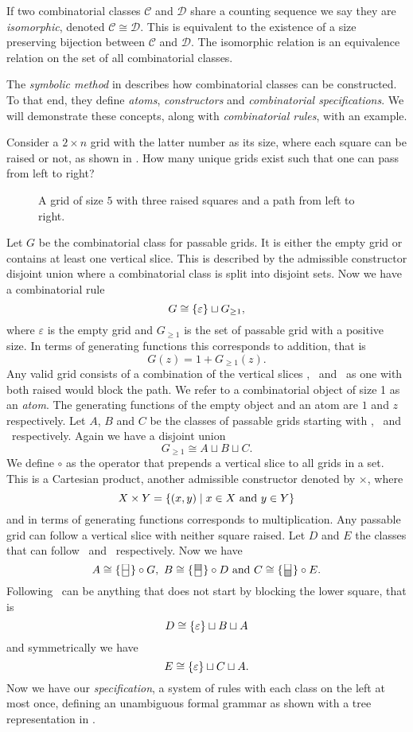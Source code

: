 If two combinatorial classes $\mathcal{C}$ and $\mathcal{D}$ share a counting sequence we say they are \emph{isomorphic}, denoted $\mathcal{C} \cong \mathcal{D}$. This is equivalent to the existence of a size preserving bijection between $\mathcal{C}$ and $\mathcal{D}$. The isomorphic relation is an equivalence relation on the set of all combinatorial classes.

The \emph{symbolic method} in  describes how combinatorial classes can be constructed. To that end, they define \emph{atoms}, \emph{constructors} and \emph{combinatorial specifications}. We will demonstrate these concepts, along with \emph{combinatorial rules}, with an example. 

Consider a $2 \times n$ grid with the latter number as its size, where each square can be raised or not, as shown in . How many unique grids exist such that one can pass from left to right?

\begin{figure}[htbp]
    \centering
    
    \caption{A grid of size $5$ with three raised squares and a path from left to right.}
    \label{fig:raised_grid}
\end{figure}

Let $G$ be the combinatorial class for passable grids. It is either the empty grid or contains at least one vertical slice. This is described by the admissible constructor disjoint union where a combinatorial class is split into disjoint sets. Now we have a combinatorial rule 
\[
    G \cong \left\{\varepsilon\right\} \sqcup G_{\geq 1},
\]
where $\varepsilon$ is the empty grid and $G_{\geq 1}$ is the set of passable grid with a positive size. In terms of generating functions this corresponds to addition, that is 
\[
    G(z) = 1 + G_{\geq1}(z).
\] 
Any valid grid consists of a combination of the vertical slices \gridN, \gridU\ and \gridD\ as one with both raised would block the path. We refer to a combinatorial object of size 1 as an \emph{atom}. The generating functions of the empty object and an atom are $1$ and $z$ respectively. Let $A$, $B$ and $C$ be the classes of passable grids starting with \gridN, \gridU\ and \gridD\ respectively. Again we have a disjoint union 
\[
    G_{\geq1} \cong A \sqcup B \sqcup C.
\]
We define $\circ$ as the operator that prepends a vertical slice to all grids in a set. This is a Cartesian product, another admissible constructor denoted by $\times$, where
\[
X \times Y = \left\{(x,y) \mid x\in X \text{ and } y \in Y\right\}
\]
and in terms of generating functions corresponds to multiplication. Any passable grid can follow a vertical slice with neither square raised. Let $D$ and $E$ the classes that can follow \gridU\ and \gridD\ respectively. Now we have 
\[
    A \cong \gridNSet \circ G, \ B \cong \gridUSet \circ D \text{ and } C \cong \gridDSet \circ E.
\]
Following \gridU\ can be anything that does not start by blocking the lower square, that is 
\[
    D \cong \left\{\varepsilon\right\} \sqcup B \sqcup A
\]
and symmetrically we have 
\[
    E \cong \left\{\varepsilon\right\} \sqcup C \sqcup A.
\]
Now we have our \emph{specification}, a system of rules with each class on the left at most once, defining an unambiguous formal grammar as shown with a tree representation in .

